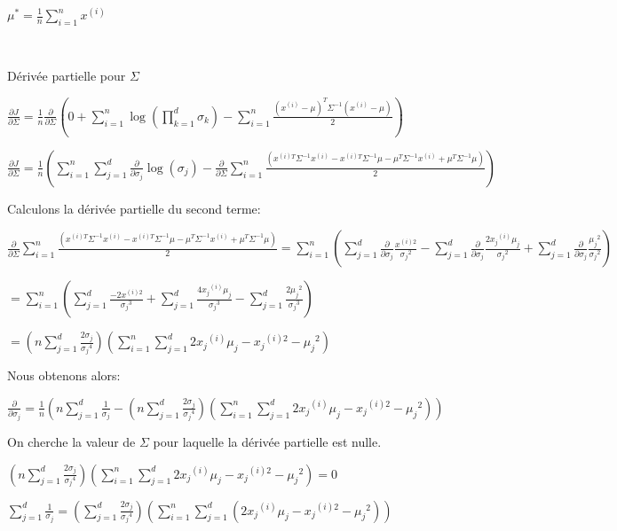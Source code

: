 \documentclass[a4paper,10pt]{article}
\begin{document}
${\mu}^* = \frac{1}{n} \sum_{i=1}^{n} {x}^{(i)}$

$ {} $

Dérivée partielle pour $\Sigma$

$\frac{\partial J}{\partial \Sigma} = \frac{1}{n} \frac{\partial }{\partial \Sigma}(0 + \sum_{i=1}^{n} \log (\prod_{k = 1}^{d} \sigma_k) - \sum_{i=1}^{n} \frac{ (x^{(i)}- \mu)^{T} \Sigma^{-1} (x^{(i)}- \mu)}{2})$

$\frac{\partial J}{\partial \Sigma} = \frac{1}{n} (\sum_{i=1}^{n}  \sum_{j=1}^{d} \frac{\partial }{\partial \sigma_j} \log (\sigma_j) - \frac{\partial }{\partial \Sigma} \sum_{i=1}^{n} \frac{ (x^{(i)T} \Sigma^{-1} x^{(i)} - x^{(i)T} \Sigma^{-1} \mu - \mu^{T}\Sigma^{-1} x^{(i)} + \mu^{T}\Sigma^{-1}\mu)}{2})$

Calculons la dérivée partielle du second terme:

$\frac{\partial }{\partial \Sigma} \sum_{i=1}^{n} \frac{ (x^{(i)T} \Sigma^{-1} x^{(i)} - x^{(i)T} \Sigma^{-1} \mu - \mu^{T}\Sigma^{-1} x^{(i)} + \mu^{T}\Sigma^{-1}\mu)}{2} = \sum_{i=1}^{n} (\sum_{j=1}^{d} \frac{\partial }{\partial \sigma_j} \frac {x^{(i)2}}{{\sigma_j}^2} - \sum_{j=1}^{d} \frac{\partial }{\partial \sigma_j} \frac {2 {x_j}^{(i)} \mu_j}{{\sigma_j}^2} + \sum_{j=1}^{d} \frac{\partial }{\partial \sigma_j} \frac{{\mu_j}^2}{{\sigma_j}^2})$

$ {} = \sum_{i=1}^{n} (\sum_{j=1}^{d} \frac {-2x^{(i)2}}{{\sigma_j}^3} + \sum_{j=1}^{d} \frac {4 {x_j}^{(i)} \mu_j}{{\sigma_j}^3} - \sum_{j=1}^{d} \frac{2{\mu_j}^2}{{\sigma_j}^3})$

$ {} = (n \sum_{j=1}^{d} \frac{2 \sigma_j}{{\sigma_j}^4}) (\sum_{i=1}^{n} \sum_{j=1}^{d} 2 {x_j}^{(i)}  \mu_j - {x_j}^{(i)2} - {\mu_j}^2)$

Nous obtenons alors:

$\frac{\partial }{\partial \sigma_j} = \frac {1}{n} (n \sum_{j = 1}^{d} \frac{1}{\sigma_j} - (n \sum_{j=1}^{d} \frac{2 \sigma_j}{{\sigma_j}^4}) (\sum_{i=1}^{n} \sum_{j=1}^{d} 2 {x_j}^{(i)}  \mu_j - {x_j}^{(i)2} - {\mu_j}^2))$

On cherche la valeur de $\Sigma$ pour laquelle la dérivée partielle est nulle.

$(n \sum_{j=1}^{d} \frac{2 \sigma_j}{{\sigma_j}^4}) (\sum_{i=1}^{n} \sum_{j=1}^{d} 2 {x_j}^{(i)}  \mu_j - {x_j}^{(i)2} - {\mu_j}^2) = 0$

$ \sum_{j = 1}^{d} \frac{1}{\sigma_j}=  (\sum_{j=1}^{d} \frac{2 \sigma_j}{{\sigma_j}^4}) ( \sum_{i=1}^{n} \sum_{j=1}^{d} (2 {x_j}^{(i)}  \mu_j - {x_j}^{(i)2} - {\mu_j}^2) )$
\end{document}
